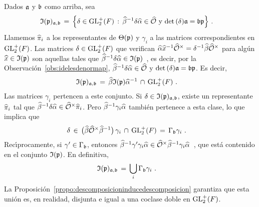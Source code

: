 \begin{obsIdelesDeNormaPPorGlobales}\label{obs:idelesdenormapporglobales}
	Dados $\frak{a}$ y $\frak{b}$ como arriba, sea
	\begin{align*}
		\frak{I}(\frak{p})_{\frak{a},\frak{b}} & \,=\,\Big\{
			\delta\in\GLtp_{2}(F)\,:\,
			\hhat{\beta}^{-1}\delta\hhat{\alpha}\in\Adfin{\cal{O}}
			\text{ y }
			\det(\delta)\frak{a}=\frak{b}\frak{p} \Big\}
		\text{ .}
	\end{align*}
	Llamemos $\hhat{\pi}_{i}$ a los representantes de $\Theta(\frak{p})$ y
	$\gamma_{i}$ a las matrices correspondientes en $\GLtp_{2}(F)$. Las
	matrices $\delta\in\GLtp_{2}(F)$ que verifican
	\begin{math}
		\hhat{\alpha}\hhat{x}^{-1}\Idfin{\cal{O}}=
			\delta^{-1}\hhat{\beta}\Idfin{\cal{O}}
	\end{math}
	para alg\'{u}n $\hhat{x}\in\frak{I}(\frak{p})$ son aquellas tales que
	\begin{math}
		\hhat{\beta}^{-1}\delta\hhat{\alpha}\in\frak{I}(\frak{p})
	\end{math}~,
	es decir, por la Observaci\'{o}n~\ref{obs:idelesdenormap},
	$\hhat{\beta}^{-1}\delta\hhat{\alpha}\in\Adfin{\cal{O}}$ y
	$\det(\delta)\frak{a}=\frak{b}\frak{p}$. Es decir,
	\begin{align*}
		\frak{I}(\frak{p})_{\frak{a},\frak{b}} & \,=\,
			\hhat{\beta}\frak{I}(\frak{p})\hhat{\alpha}^{-1}\,\cap\,
			\GLtp_{2}(F)
		\text{ .}
	\end{align*}
	Las matrices $\gamma_{i}$ pertencen a este conjunto. Si
	$\delta\in\frak{I}(\frak{p})_{\frak{a},\frak{b}}$, existe un
	representante $\hhat{\pi}_{i}$ tal que
	$\hhat{\beta}^{-1}\delta\hhat{\alpha}\in\Idfin{\cal{O}}\hhat{\pi}_{i}$.
	Pero $\hhat{\beta}^{-1}\gamma_{i}\hhat{\alpha}$ tambi\'{e}n pertenece a
	esta clase, lo que implica que
	\begin{align*}
		\delta & \,\in\,\big(\hhat{\beta}\Idfin{\cal{O}}
			\hhat{\beta}^{-1}\big)\,\gamma_{i}\,\cap\,\GLtp_{2}(F)
		\,=\,\Gamma_{\frak{b}}\gamma_{i}
		\text{ .}
	\end{align*}
	Rec\'{\i}procamente, si $\gamma'\in\Gamma_{\frak{b}}$, entonces
	\begin{math}
		\hhat{\beta}^{-1}\gamma'\gamma_{i}\hhat{\alpha}\in
		\Idfin{\cal{O}}\hhat{\beta}^{-1}\gamma_{i}\hhat{\alpha}
	\end{math}~,
	que est\'{a} contenido en el conjunto $\frak{I}(\frak{p})$. En
	definitiva,
	\begin{align*}
		\frak{I}(\frak{p})_{\frak{a},\frak{b}} & \,=\,
			\bigcup_{i}\Gamma_{\frak{b}}\gamma_{i}
		\text{ .}
	\end{align*}
	La Proposici\'{o}n~\ref{propo:descomposicioninducedescomposicion}
	garantiza que esta uni\'{o}n es, en realidad, disjunta e igual a una
	coclase doble en $\GLtp_{2}(F)$.
\end{obsIdelesDeNormaPPorGlobales}

